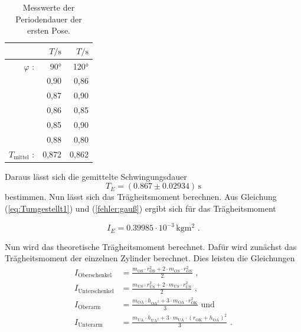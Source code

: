 \begin{table}[H]
  \centering
  \caption{Messwerte der Periodendauer der ersten Pose.}
  \label{tab:PeriodendauerPose1}
  \begin{tabular}{rrr}
    \toprule
     & $T / \unit\second$ &  $T / \unit\second$  \\
    \midrule
    $\varphi$ : & 90° & 120° \\
    \midrule
          & 0,90 &        0,86 \\
          & 0,87 &        0,90 \\
          & 0,86 &        0,85 \\
          & 0,85 &        0,90 \\
          & 0,88 &        0,80 \\
    \midrule
    $T_{\text{mittel}}$ : & 0,872 & 0,862 \\
    \bottomrule
    \end{tabular}
\end{table}

Daraus lässt sich die gemittelte Schwingungsdauer
\begin{equation*}
  T_E = (0.867 \pm 0.02934) \, \unit\second
\end{equation*}
bestimmen.
Nun lässt sich das Trägheitsmoment berechnen.
Aus Gleichung (\ref{eq:Tumgestellt1}) und (\ref{fehler:gauß}) ergibt sich für das Trägheitsmoment

\begin{equation*}
  I_E = 0.39985 \cdot 10^{-3}  %
  \, \unit{\kilo\gram\meter\squared} \text{ .}
\end{equation*}

Nun wird das theoretische Trägheitsmoment berechnet.
Dafür wird zunächst das Trägheitsmoment der einzelnen Zylinder berechnet.
Dies leisten die Gleichungen
\begin{align*} \label{I_Puppe}
  I_{\text{Oberschenkel}} &= \frac{m_{\text{OS}} \cdot r_{\text{OS}}^2 + 2 \cdot m_{OS} \cdot r_{OS}^2} {2}  \text{ ,}\\
  I_{\text{Unterschenkel}} &= \frac{m_{\text{US}} \cdot r_{\text{US}}^2 + 2 \cdot m_{US} \cdot r_{US}^2} {2}  \text{ ,}\\
  I_{\text{Oberarm}} &= \frac{m_{\text{OA}} \cdot h_{\text{OA}^2} + 3 \cdot m_{\text{OA}} \cdot r_{\text{OK}}^2} {3}  \text{ und}\\
  I_{\text{Unterarm}} &= \frac{m_{\text{UA}} \cdot h_{\text{UA}^2} + 3 \cdot m_{\text{UA}} \cdot \left( r_{\text{OK}} + h_{\text{OA}}\right)^2} {3} \text{ .} \\
\end{align*}

